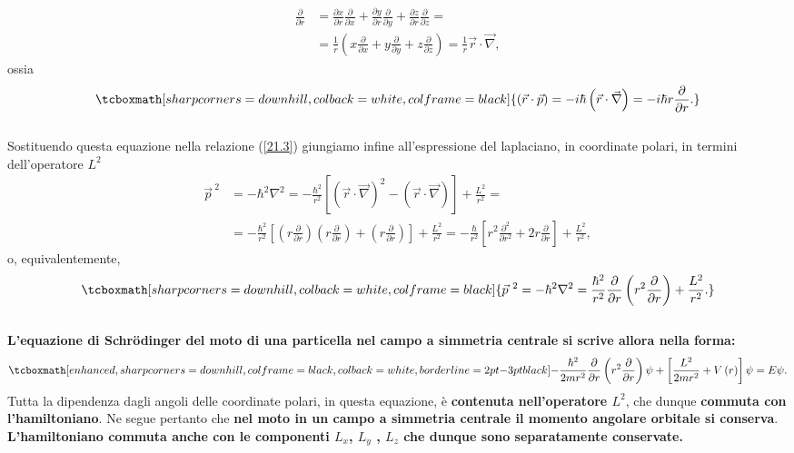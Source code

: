 	\begin{align} 
		\frac{\partial}{\partial r}&= \frac{\partial x}{\partial r} \frac{\partial}{\partial x}+\frac{\partial y}{\partial r} \frac{\partial}{\partial y}+\frac{\partial z}{\partial r} \frac{\partial}{\partial z}= \nonumber \\
		&=  \frac{1}{r}\left(x\frac{\partial}{\partial x}+y\frac{\partial}{\partial y}+z\frac{\partial}{\partial z}\right)=\frac{1}{r}\vec{r}\cdot\vec{\nabla} ,
	\end{align}
ossia
	\begin{equation}
		\tcboxmath[sharp corners=downhill, colback=white, colframe=black]{
			\left(\vec{r}\cdot\vec{p}\right)=-i\hbar\left(\vec{r}\cdot\vec{\nabla}\right)=-i\hbar r \frac{\partial}{\partial r} .
			}
	\end{equation}\\
	
Sostituendo questa equazione nella relazione (\ref{21.3}) giungiamo infine all'espressione del laplaciano, in coordinate polari, in termini dell'operatore $L^2$
	\begin{align}
		\vec{p}^{\ 2}&= -\hbar^2\nabla^2= -\frac{\hbar ^2}{r^2}\left[ \left( \vec{r}\cdot \vec{\nabla} \right) ^2 - \left( \vec{r}\cdot \vec{\nabla} \right)\right] +\frac{L^2}{r^2} = \nonumber \\
		&= -\frac{\hbar^2}{r^2}\left[\left(r\frac{\partial}{\partial r}\right)\left(r\frac{\partial}{\partial r}\right)+\left(r\frac{\partial}{\partial r}\right)\right]+\frac{L^2}{r^2}= -\frac{\hbar}{r^2}\left[r^2\frac{\partial^2}{\partial r^2}+2r\frac{\partial}{\partial r}\right]+\frac{L^2}{r^2} ,
	\end{align}
o, equivalentemente,
	\begin{equation}
		\tcboxmath[sharp corners=downhill, colback=white, colframe=black]{
			\vec{p}^{\ 2}=-\hbar^2\nabla^2=\frac{\hbar^2}{r^2}\frac{\partial}{\partial r}\left(r^2 \frac{\partial}{\partial r}\right)+\frac{L^2}{r^2} .
			}
	\end{equation}\\
	
\textbf{L'equazione di Schr\"{o}dinger del moto di una particella nel campo a simmetria centrale si scrive allora nella forma:}
	\begin{equation}
		\tcboxmath[enhanced, sharp corners=downhill, colframe=black, colback=white, borderline={2pt}{-3pt}{black}]{
			-\frac{\hbar^2}{2mr^2}\frac{\partial}{\partial r}\left(r^2\frac{\partial}{\partial r}\right)\psi+\left[\frac{L^2}{2mr^2}+V\left(r\right)\right]\psi=E\psi .
			}
	\end{equation}
Tutta la dipendenza dagli angoli delle coordinate polari, in questa equazione, è \textbf{contenuta nell'operatore $L^2$}, che dunque \textbf{commuta con l'hamiltoniano}. Ne segue pertanto che\textbf{ nel moto in un campo a simmetria centrale il momento angolare orbitale si conserva}. \textbf{L'hamiltoniano commuta anche con le componenti $L_x$, $L_y$ , $L_z$ che dunque sono separatamente conservate.}\\

